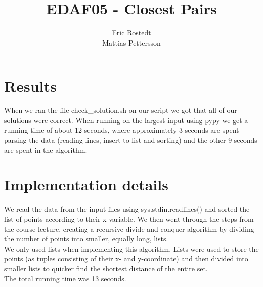 \documentclass{article}
\title{EDAF05 - Closest Pairs}
\author{Eric Rostedt \\ Mattias Pettersson}
\begin{document}
\maketitle

\section{Results}


When we ran the file check\_solution.sh on our script we got that all of our solutions were correct. When running on the largest input using pypy we get a running time of about 12 seconds, where approximately 3 seconds are spent parsing the data (reading lines, insert to list and sorting) and the other 9 seconds are spent in the algorithm. 

\section{Implementation details}

We read the data from the input files using sys.stdin.readlines() and sorted the list of points according to their x-variable. We then went through the steps from the course lecture, creating a recursive divide and conquer algorithm by dividing the number of points into smaller, equally long, lists.\\

We only used lists when implementing this algorithm. Lists were used to store the points (as tuples consisting of their x- and y-coordinate) and then divided into smaller lists to quicker find the shortest distance of the entire set.\\

The total running time was 13 seconds.\\
\end{document}
